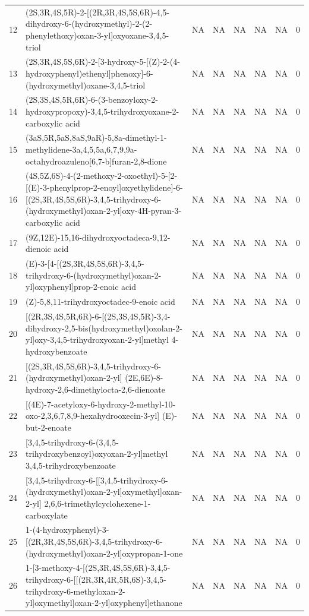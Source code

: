 \documentclass[a4paper]{article}
\begin{document}
\begin{longtable}{rlllllll}
  12 & (2S,3R,4S,5R)-2-[(2R,3R,4S,5S,6R)-4,5-dihydroxy-6-(hydroxymethyl)-2-(2-phenylethoxy)oxan-3-yl]oxyoxane-3,4,5-triol & NA & NA & NA & NA & NA & 0 \\ 
  13 & (2S,3R,4S,5S,6R)-2-[3-hydroxy-5-[(Z)-2-(4-hydroxyphenyl)ethenyl]phenoxy]-6-(hydroxymethyl)oxane-3,4,5-triol & NA & NA & NA & NA & NA & 0 \\ 
  14 & (2S,3S,4S,5R,6R)-6-(3-benzoyloxy-2-hydroxypropoxy)-3,4,5-trihydroxyoxane-2-carboxylic acid & NA & NA & NA & NA & NA & 0 \\ 
  15 & (3aS,5R,5aS,8aS,9aR)-5,8a-dimethyl-1-methylidene-3a,4,5,5a,6,7,9,9a-octahydroazuleno[6,7-b]furan-2,8-dione & NA & NA & NA & NA & NA & 0 \\ 
  16 & (4S,5Z,6S)-4-(2-methoxy-2-oxoethyl)-5-[2-[(E)-3-phenylprop-2-enoyl]oxyethylidene]-6-[(2S,3R,4S,5S,6R)-3,4,5-trihydroxy-6-(hydroxymethyl)oxan-2-yl]oxy-4H-pyran-3-carboxylic acid & NA & NA & NA & NA & NA & 0 \\ 
  17 & (9Z,12E)-15,16-dihydroxyoctadeca-9,12-dienoic acid & NA & NA & NA & NA & NA & 0 \\ 
  18 & (E)-3-[4-[(2S,3R,4S,5S,6R)-3,4,5-trihydroxy-6-(hydroxymethyl)oxan-2-yl]oxyphenyl]prop-2-enoic acid & NA & NA & NA & NA & NA & 0 \\ 
  19 & (Z)-5,8,11-trihydroxyoctadec-9-enoic acid & NA & NA & NA & NA & NA & 0 \\ 
  20 & [(2R,3S,4S,5R,6R)-6-[(2S,3S,4S,5R)-3,4-dihydroxy-2,5-bis(hydroxymethyl)oxolan-2-yl]oxy-3,4,5-trihydroxyoxan-2-yl]methyl 4-hydroxybenzoate & NA & NA & NA & NA & NA & 0 \\ 
  21 & [(2S,3R,4S,5S,6R)-3,4,5-trihydroxy-6-(hydroxymethyl)oxan-2-yl] (2E,6E)-8-hydroxy-2,6-dimethylocta-2,6-dienoate & NA & NA & NA & NA & NA & 0 \\ 
  22 & [(4E)-7-acetyloxy-6-hydroxy-2-methyl-10-oxo-2,3,6,7,8,9-hexahydrooxecin-3-yl] (E)-but-2-enoate & NA & NA & NA & NA & NA & 0 \\ 
  23 & [3,4,5-trihydroxy-6-(3,4,5-trihydroxybenzoyl)oxyoxan-2-yl]methyl 3,4,5-trihydroxybenzoate & NA & NA & NA & NA & NA & 0 \\ 
  24 & [3,4,5-trihydroxy-6-[[3,4,5-trihydroxy-6-(hydroxymethyl)oxan-2-yl]oxymethyl]oxan-2-yl] 2,6,6-trimethylcyclohexene-1-carboxylate & NA & NA & NA & NA & NA & 0 \\ 
  25 & 1-(4-hydroxyphenyl)-3-[(2R,3R,4S,5S,6R)-3,4,5-trihydroxy-6-(hydroxymethyl)oxan-2-yl]oxypropan-1-one & NA & NA & NA & NA & NA & 0 \\ 
  26 & 1-[3-methoxy-4-[(2S,3R,4S,5S,6R)-3,4,5-trihydroxy-6-[[(2R,3R,4R,5R,6S)-3,4,5-trihydroxy-6-methyloxan-2-yl]oxymethyl]oxan-2-yl]oxyphenyl]ethanone & NA & NA & NA & NA & NA & 0 \\ 

\end{longtable}
\end{document}

